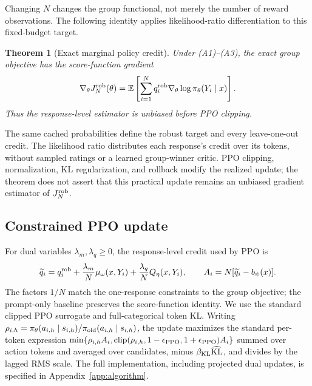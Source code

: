 \documentclass{article}
\newtheorem{theorem}{Theorem}
\theoremstyle{definition}
\theoremstyle{remark}
\begin{document}
Changing \(N\) changes the group functional, not merely the number of reward
observations. The following identity applies likelihood-ratio differentiation
\citep{williams1992simple,sutton1999policy} to this fixed-budget target.

\begin{theorem}[Exact marginal policy credit]
\label{thm:main-gradient}
Under (A1)--(A3), the exact group objective has the score-function gradient
\begin{equation}
\label{eq:robust-policy-gradient}
\nabla_\theta J_N^{\rm rob}(\theta)=\mathbb E\left[
\sum_{i=1}^{N}q_i^{\rm rob}\nabla_\theta\log\pi_\theta(Y_i\mid x)\right].
\end{equation}
Thus the response-level estimator is unbiased before PPO clipping.
\end{theorem}

The same cached probabilities define the robust target and every leave-one-out
credit. The likelihood ratio distributes each response's credit over its
tokens, without sampled ratings or a learned group-winner critic. PPO clipping,
normalization, KL regularization, and rollback modify the realized update;
the theorem does not assert that this practical update remains an unbiased
gradient estimator of \(J_N^{\rm rob}\).

\subsection{Constrained PPO update}
\label{subsec:constrained-credit}

For dual variables \(\lambda_m,\lambda_q\ge0\), the response-level credit used
by PPO is
\begin{equation}
\label{eq:constrained-credit}
\widetilde q_i=q_i^{\rm rob}+\frac{\lambda_m}{N}\mu_\omega(x,Y_i)
 +\frac{\lambda_q}{N}Q_\eta(x,Y_i),\qquad
A_i=N[\widetilde q_i-b_\psi(x)].
\end{equation}
The factors \(1/N\) match the one-response constraints to the group objective;
the prompt-only baseline preserves the score-function identity.  We use the
standard clipped PPO surrogate \citep{schulman2017proximal} and
full-categorical token KL.  Writing
\(\rho_{i,h}=\pi_\theta(a_{i,h}\mid s_{i,h})/
\pi_{\rm old}(a_{i,h}\mid s_{i,h})\), the update maximizes the standard
per-token expression \(\min\{\rho_{i,h}A_i,
\operatorname{clip}(\rho_{i,h},1-\epsilon_{\rm PPO},1+\epsilon_{\rm PPO})A_i\}\)
summed over action tokens and averaged over candidates, minus
\(\beta_{\rm KL}\widehat{\mathrm{KL}}\), and divides
by the lagged RMS scale.  The full implementation, including projected dual
updates, is specified in Appendix~\ref{app:algorithm}.
\end{document}
